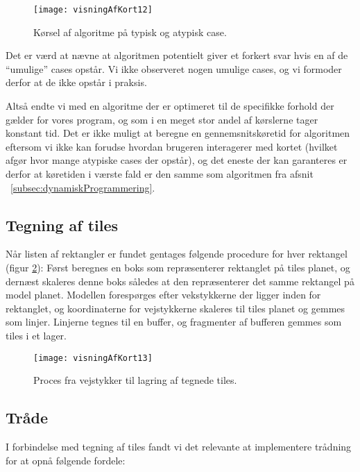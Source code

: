 \begin{figure}[h]
	\centering
	\texttt{[image: visningAfKort12]}
	\captionsetup{width=0.8\textwidth}
	\caption{Kørsel af algoritme på typisk og atypisk case.}
	\label{figur:visningAfKort12}
\end{figure}

Det er værd at nævne at algoritmen potentielt giver et forkert svar hvis en af de ``umulige'' cases opstår. Vi ikke observeret nogen umulige cases, og vi formoder derfor at de ikke opstår i praksis.

Altså endte vi med en algoritme der er optimeret til de specifikke forhold der gælder for vores program, og som i en meget stor andel af kørslerne tager konstant tid. Det er ikke muligt at beregne en gennemsnitskøretid for algoritmen eftersom vi ikke kan forudse hvordan brugeren interagerer med kortet (hvilket afgør hvor mange atypiske cases der opstår), og det eneste der kan garanteres er derfor at køretiden i værste fald er den samme som algoritmen fra afsnit ~\ref{subsec:dynamiskProgrammering}.

\subsection{Tegning af tiles}
\label{subsec:tegningAfTiles}

Når listen af rektangler er fundet gentages følgende procedure for hver rektangel (figur \ref{figur:visningAfKort13}): Først beregnes en boks som repræsenterer rektanglet på tiles planet, og dernæst skaleres denne boks således at den repræsenterer det samme rektangel på model planet. Modellen forespørges efter vekstykkerne der ligger inden for rektanglet, og koordinaterne for vejstykkerne skaleres til tiles planet og gemmes som linjer. Linjerne tegnes til en buffer, og fragmenter af bufferen gemmes som tiles i et lager.

\begin{figure}[h]
	\centering
	\texttt{[image: visningAfKort13]}
	\captionsetup{width=0.8\textwidth}
	\caption{Proces fra vejstykker til lagring af tegnede tiles.}
	\label{figur:visningAfKort13}
\end{figure}

\subsection{Tråde}
\label{subsec:traade}

I forbindelse med tegning af tiles fandt vi det relevante at implementere trådning for at opnå følgende fordele:

